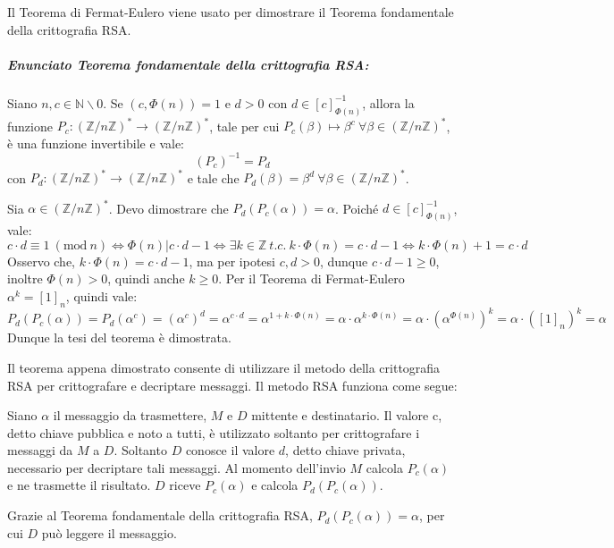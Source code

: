 \documentclass[12pt, a4paper]{report}
\theoremstyle{definition}
\newcommand{\Mod}[1]{\ (\mathrm{mod}\ #1)}
\newcommand{\inv}{(\mathbb{Z}/n\mathbb{Z})^*}
\begin{document}
Il Teorema di Fermat-Eulero viene usato per dimostrare il Teorema fondamentale
della crittografia RSA.
\subparagraph{Enunciato Teorema fondamentale della crittografia RSA:}
Siano $n,c\in\mathbb{N}\backslash0$. Se $(c,\Phi(n))=1$ e $d>0$ con $d\in[c]^{-1}
_{\Phi(n)}$, allora la funzione $P_c:\inv\to\inv$, tale per cui $P_c(\beta)
\mapsto\beta^c\ \forall\beta\in\inv$, è una funzione invertibile e vale:
\[\left(P_c\right)^{-1}=P_d\]
con $P_d:\inv\to\inv$ e tale che $P_d(\beta)=\beta^d\ \forall\beta\in\inv$.
\begin{demonstration}
    Sia $\alpha\in\inv$. Devo dimostrare che $P_d\left(P_c(\alpha)\right)=\alpha$.
    Poiché $d\in[c]^{-1}_{\Phi(n)}$, vale:
    \[c\cdot d\equiv1\Mod{n}\Leftrightarrow\Phi(n)|c\cdot d-1\Leftrightarrow
    \exists k\in\mathbb{Z}\ t.c.\ k\cdot\Phi(n)=c\cdot d-1\Leftrightarrow k\cdot
    \Phi(n)+1=c\cdot d\]
    Osservo che, $k\cdot\Phi(n)=c\cdot d-1$, ma per ipotesi $c,d>0$, dunque $c
    \cdot d-1\geq0$, inoltre $\Phi(n)>0$, quindi anche $k\geq0$. Per il Teorema
    di Fermat-Eulero $\alpha^k=[1]_n$, quindi vale:
    \[P_d\left(P_c(\alpha)\right)=P_d\left(\alpha^c\right)=\left(\alpha^c\right)
    ^d=\alpha^{c\cdot d}=\alpha^{1+k\cdot\Phi(n)}=\alpha\cdot\alpha^{k\cdot\Phi(n)}
    =\alpha\cdot\left(\alpha^{\Phi(n)}\right)^k=\alpha\cdot\left([1]_n\right)^k=
    \alpha\]
    Dunque la tesi del teorema è dimostrata.
\end{demonstration}
Il teorema appena dimostrato consente di utilizzare il metodo della crittografia
RSA per crittografare e decriptare messaggi. Il metodo RSA funziona come segue:

Siano $\alpha$ il messaggio da trasmettere, $M$ e $D$ mittente e destinatario.
Il valore c, detto chiave pubblica e noto a tutti, è utilizzato soltanto per
crittografare i messaggi da $M$ a $D$. Soltanto $D$ conosce il valore $d$, detto
chiave privata, necessario per decriptare tali messaggi. Al momento dell'invio
$M$ calcola $P_c(\alpha)$ e ne trasmette il risultato. $D$ riceve $P_c(\alpha)$
e calcola $P_d\left(P_c(\alpha)\right)$.

Grazie al Teorema fondamentale della crittografia RSA,
$P_d\left(P_c(\alpha)\right)=\alpha$, per cui $D$ può leggere il messaggio.
\end{document}
